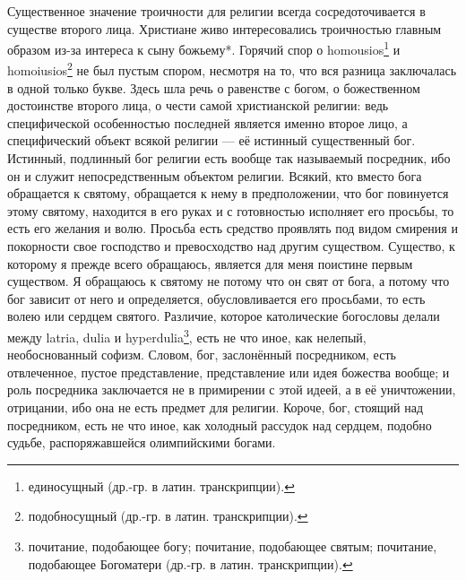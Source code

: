 \documentclass[12pt,oneside]{book}
\begin{document}
Существенное значение троичности для религии всегда сосредоточивается в существе второго лица. Христиане живо интересовались троичностью главным образом из-за интереса к сыну божьему*\let\svthefootnote\thefootnote\let\thefootnote\relax{}\let\thefootnote\svthefootnote. Горячий спор о homousios\footnote{единосущный (др.-гр. в латин. транскрипции).} и homoiusios\footnote{подобносущный (др.-гр. в латин. транскрипции).} не был пустым спором, несмотря на то, что вся разница заключалась в одной только букве. Здесь шла речь о равенстве с богом, о божественном достоинстве второго лица, о чести самой христианской религии: ведь специфической особенностью последней является именно второе лицо, а специфический объект всякой религии --- её истинный существенный бог. Истинный, подлинный бог религии есть вообще так называемый посредник, ибо он и служит непосредственным объектом религии. Всякий, кто вместо бога обращается к святому, обращается к нему в предположении, что бог повинуется этому святому, находится в его руках и с готовностью исполняет его просьбы, то есть его желания и волю. Просьба есть средство проявлять под видом смирения и покорности свое господство и превосходство над другим существом. Существо, к которому я прежде всего обращаюсь, является для меня поистине первым существом. Я обращаюсь к святому не потому что он свят от бога, а потому что бог зависит от него и определяется, обусловливается его просьбами, то есть волею или сердцем святого. Различие, которое католические богословы делали между latria, dulia и hyperdulia\footnote{почитание, подобающее богу; почитание, подобающее святым; почитание, подобающее Богоматери (др.-гр. в латин. транскрипции).}, есть не что иное, как нелепый, необоснованный софизм. Словом, бог, заслонённый посредником, есть отвлеченное, пустое представление, представление или идея божества вообще; и роль посредника заключается не в примирении с этой идеей, а в её уничтожении, отрицании, ибо она не есть предмет для религии\dag\let\svthefootnote\thefootnote\let\thefootnote\relax{}\let\thefootnote\svthefootnote. Короче, бог, стоящий над посредником, есть не что иное, как холодный рассудок над сердцем, подобно судьбе, распоряжавшейся олимпийскими богами.
\end{document}

